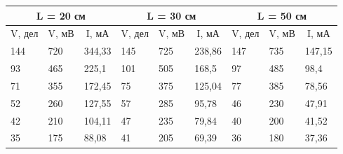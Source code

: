 \documentclass[a4paper,12pt]{article} %
\begin{document}
\begin{table}[h!]
\begin{tabular}{|lll|lll|lll|}
\hline
\multicolumn{3}{|c|}{L = 20 см}                                                        & \multicolumn{3}{c|}{L =   30 см}                                                      & \multicolumn{3}{c|}{L =   50 см}                                                      \\ \hline
\multicolumn{1}{|c|}{V, дел} & \multicolumn{1}{c|}{V, мВ} & \multicolumn{1}{c|}{I, мА} & \multicolumn{1}{c|}{V, дел} & \multicolumn{1}{c|}{V, мВ} & \multicolumn{1}{c|}{I, мА} & \multicolumn{1}{c|}{V, дел} & \multicolumn{1}{c|}{V, мВ} & \multicolumn{1}{c|}{I, мА} \\ \hline
\multicolumn{1}{|l|}{144}    & \multicolumn{1}{l|}{720}   & 344,33                     & \multicolumn{1}{l|}{145}    & \multicolumn{1}{l|}{725}   & 238,86                     & \multicolumn{1}{l|}{147}    & \multicolumn{1}{l|}{735}   & 147,15                     \\ \hline
\multicolumn{1}{|l|}{93}     & \multicolumn{1}{l|}{465}   & 225,1                      & \multicolumn{1}{l|}{101}    & \multicolumn{1}{l|}{505}   & 168,5                      & \multicolumn{1}{l|}{97}     & \multicolumn{1}{l|}{485}   & 98,4                       \\ \hline
\multicolumn{1}{|l|}{71}     & \multicolumn{1}{l|}{355}   & 172,45                     & \multicolumn{1}{l|}{75}     & \multicolumn{1}{l|}{375}   & 125,04                     & \multicolumn{1}{l|}{77}     & \multicolumn{1}{l|}{385}   & 78,56                      \\ \hline
\multicolumn{1}{|l|}{52}     & \multicolumn{1}{l|}{260}   & 127,55                     & \multicolumn{1}{l|}{57}     & \multicolumn{1}{l|}{285}   & 95,78                      & \multicolumn{1}{l|}{46}     & \multicolumn{1}{l|}{230}   & 47,91                      \\ \hline
\multicolumn{1}{|l|}{42}     & \multicolumn{1}{l|}{210}   & 104,11                     & \multicolumn{1}{l|}{47}     & \multicolumn{1}{l|}{235}   & 79,84                      & \multicolumn{1}{l|}{40}     & \multicolumn{1}{l|}{200}   & 41,52                      \\ \hline
\multicolumn{1}{|l|}{35}     & \multicolumn{1}{l|}{175}   & 88,08                      & \multicolumn{1}{l|}{41}     & \multicolumn{1}{l|}{205}   & 69,39                      & \multicolumn{1}{l|}{36}     & \multicolumn{1}{l|}{180}   & 37,36                      \\ \hline

\end{tabular}
\end{table}
\end{document}
